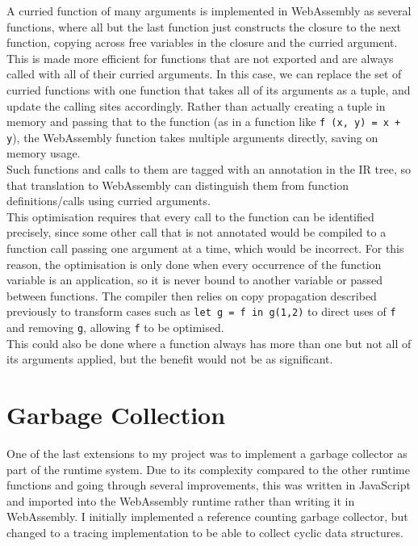 A curried function of many arguments is implemented in WebAssembly as several functions, where all but the last function just constructs the closure to the next function, copying across free variables in the closure and the curried argument. \\
This is made more efficient for functions that are not exported and are always called with all of their curried arguments.  In this case, we can replace the set of curried functions with one function that takes all of its arguments as a tuple, and update the calling sites accordingly. Rather than actually creating a tuple in memory and passing that to the function (as in a function like \verb|f (x, y) = x + y|), the WebAssembly function takes multiple arguments directly, saving on memory usage. \\
Such functions and calls to them are tagged with an annotation in the IR tree, so that translation to WebAssembly can distinguish them from function definitions/calls using curried arguments. \\
This optimisation requires that every call to the function can be identified precisely, since some other call that is not annotated would be compiled to a function call passing one argument at a time, which would be incorrect. For this reason, the optimisation is only done when every occurrence of the function variable is an application, so it is never bound to another variable or passed between functions. The compiler then relies on copy propagation described previously to transform cases such as  \verb|let g = f in g(1,2)| to direct uses of \verb|f| and removing \verb|g|, allowing \verb|f| to be optimised. \\
This could also be done where a function always has more than one but not all of its arguments applied, but the benefit would not be as significant.


\section{Garbage Collection}
One of the last extensions to my project was to implement a garbage collector as part of the runtime system. Due to its complexity compared to the other runtime functions and going through several improvements, this was written in JavaScript and imported into the WebAssembly runtime rather than writing it in WebAssembly. I initially implemented a reference counting garbage collector, but changed to a tracing implementation to be able to collect cyclic data structures.

